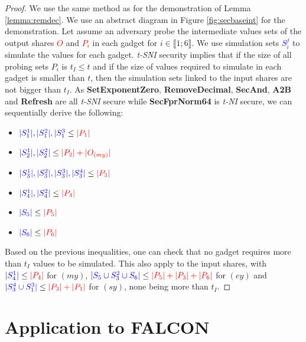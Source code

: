 \documentclass[runningheads]{llncs}
\begin{document}
\begin{proof}
  We use the same method as for the demonstration of Lemma \ref{lemma:remdec}. We use an abstract diagram in Figure \ref{fig:secbaseint} for the demonstration. Let assume an adversary probe the intermediate values sets of the output shares \textcolor{red}{$O$} and \textcolor{red}{$P_i$} in each gadget for $i\in\llbracket 1;6 \rrbracket$. We use simulation sets \textcolor{blue}{$S_i^j$} to simulate the values for each gadget. \emph{t-SNI} security implies that if the size of all probing sets $P_i$ is $t_I\leq t$ and if the size of values required to simulate in each gadget is smaller than $t$, then the simulation sets linked to the input shares are not bigger than $t_I$. As \textbf{SetExponentZero}, \textbf{RemoveDecimal}, \textbf{SecAnd}, \textbf{A2B} and \textbf{Refresh} are all \emph{t-SNI} secure while \textbf{SecFprNorm64} is \emph{t-NI} secure, we can sequentially derive the following:
  \begin{multicols}{2}
    \begin{itemize}
      \item $\textcolor{blue}{|S_1^1|,|S_1^2|,|S_1^3} \leq \textcolor{red}{|P_1|}$
      \item $\textcolor{blue}{|S_2^1|,|S_2^2|} \leq \textcolor{red}{|P_2| +|O_{(my)}|} $
      \item $\textcolor{blue}{|S_3^1|,|S_3^2|,|S_3^3|,|S_3^4|} \leq \textcolor{red}{|P_3|}$
      \item $\textcolor{blue}{|S_4^1|,|S_4^2|} \leq \textcolor{red}{|P_4|}$
      \item $\textcolor{blue}{|S_5|} \leq \textcolor{red}{|P_5|}$
      \item $\textcolor{blue}{|S_6|} \leq \textcolor{red}{|P_6|}$
    \end{itemize}
  \end{multicols}
  Based on the previous inequalities, one can check that no gadget requires more than $t_I$ values to be simulated. This also apply to the input shares, with $\textcolor{blue}{|S_{4}^1|}\leq\textcolor{red}{|P_4|}$ for $(my)$, $\textcolor{blue}{|S_5 \cup S_3^2\cup S_6|}\leq\textcolor{red}{|P_5|+|P_3| + |P_6|}$ for $(ey)$ and $\textcolor{blue}{|S_3^4\cup S_1^3|}\leq\textcolor{red}{|P_3|+|P_1|}$ for $(sy)$, none being more than $t_I$.
\end{proof}

\section{Application to FALCON}\label{sec:appfalcon}
\end{document}
